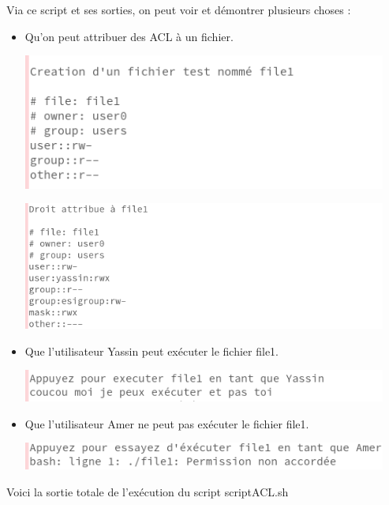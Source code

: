 \documentclass{article}
\begin{document}
Via ce script et ses sorties, on peut voir et démontrer plusieurs choses : 
\begin{itemize}
\item Qu'on peut attribuer des ACL à un fichier.
\begin{center}
\includegraphics[width=12cm]{images/aclBefore.png}
\end{center}
\begin{center}
\includegraphics[width=12cm]{images/aclAfter.png}
\end{center}
\item Que l'utilisateur Yassin peut exécuter le fichier file1.
\begin{center}
\includegraphics[width=12cm]{images/testYassin.png}
\end{center}
\item Que l'utilisateur Amer ne peut pas exécuter le fichier file1.
\begin{center}
\includegraphics[width=12cm]{images/testAmer.png}
\end{center}
\end{itemize}
\newpage
Voici la sortie totale de l'exécution du script scriptACL.sh
\end{document}
